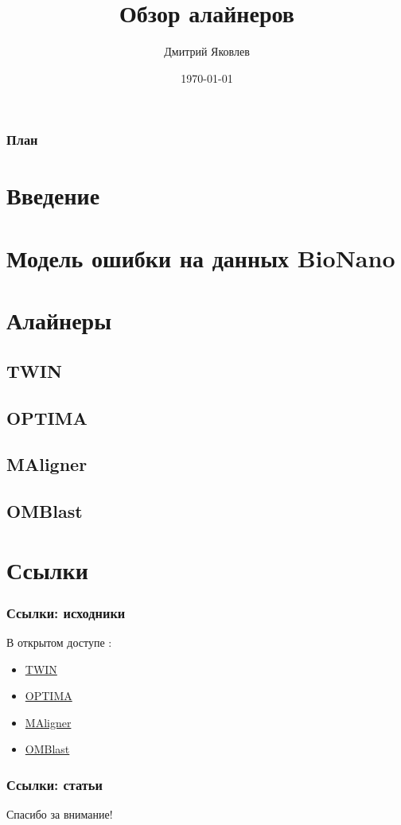 \documentclass{beamer}
\title[Обзор алайнеров]{Обзор алайнеров}
\author{Дмитрий Яковлев}
\institute{EPAM Systems}
\date{\today}
\begin{document}
\graphicspath{{./img/}}

\begin{frame}
  \titlepage
\end{frame}

\begin{frame}
\frametitle{План}
\tableofcontents
\end{frame}

\section{Введение}


\section{Модель ошибки на данных BioNano}


\section{Алайнеры}

\subsection{TWIN}


\subsection{OPTIMA}


\subsection{MAligner}


\subsection{OMBlast}


\section{Ссылки}
\begin{frame}
\frametitle{Ссылки: исходники}
В открытом доступе \nocite{*}:
\begin{itemize}
  \item \href{http://www.cs.colostate.edu/twin/download.html}{TWIN}
  \item \href{https://github.com/verznet/OPTIMA}{OPTIMA}
  \item \href{https://github.com/LeeMendelowitz/maligner}{MAligner}
  \item \href{https://github.com/aldenleung/OMBlast}{OMBlast}
\end{itemize}
\end{frame}

\begin{frame}[t,allowframebreaks]
\frametitle{Ссылки: статьи}
\printbibliography
\end{frame}

\begin{frame}

\begin{center}
\Huge Спасибо за внимание!
\end{center}

\end{frame}
\end{document}
